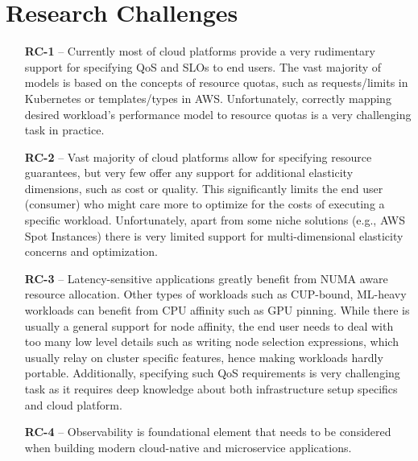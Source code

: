 \section{Research Challenges}
\label{sec:Challenges}

\begin{itemize}
	\item [\textbf{RC-1}] -- 
	Currently most of cloud platforms provide a very rudimentary
	support for specifying QoS and SLOs to end users. The vast majority 
	of models is based on the concepts of resource quotas, such as
	requests/limits in Kubernetes or templates/types in AWS. Unfortunately,
	correctly mapping desired workload's performance model to 
	resource quotas is a very challenging task in practice.
	
	\item [\textbf{RC-2}] -- 
	Vast majority of cloud platforms allow for specifying resource guarantees,
	but very few offer any support for additional elasticity dimensions,
	such as cost or quality. This significantly limits the end user (consumer)
	who might care more to optimize for the costs of executing a specific workload.
	Unfortunately, apart from some niche solutions (e.g., AWS Spot Instances)
	there is very limited support for multi-dimensional elasticity concerns 
	and optimization.
	
	\item [\textbf{RC-3}] -- 
	Latency-sensitive applications greatly benefit from NUMA aware 
	resource allocation. Other types of workloads such as CUP-bound, 
	ML-heavy workloads can benefit from CPU affinity such as GPU pinning.
	While there is usually a general support for node affinity, the 
	end user needs to	deal with too many low level details such
	as writing node selection expressions, which usually relay 
	on cluster specific features, hence making workloads hardly portable.
	Additionally, specifying such QoS requirements is very challenging task
	as it requires deep knowledge about both infrastructure setup specifics
	and cloud platform.
	
	\item [\textbf{RC-4}] -- 
	Observability is foundational element that needs to be considered 
	when building modern cloud-native and microservice applications.
	

\end{itemize}
